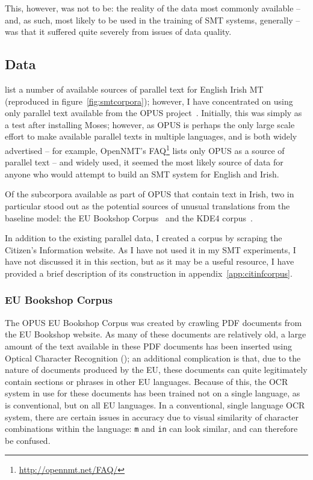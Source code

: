This, however, was not to be: the reality of the data most commonly available -- and, as such, most likely
to be used in the training of SMT systems, generally -- was that it suffered quite severely from issues
of data quality.

\subsection{Data}
\label{ssect:smtdata}

\citet{ARCAN16.9} list a number of available sources of parallel text for English Irish MT (reproduced in figure~\ref{fig:smtcorpora}); however, I have concentrated
on using only parallel text available from the OPUS project~\citep{TIEDEMANN12.463}. Initially, this was simply as a test after
installing Moses; however, as OPUS is perhaps the only large scale effort to make available parallel texts in multiple languages,
and is both widely advertised -- for example, OpenNMT's FAQ\footnote{\href{http://opennmt.net/FAQ/}{http://opennmt.net/FAQ/}}
lists only OPUS as a source of parallel text -- and widely used, it seemed the most likely source of data
for anyone who would attempt to build an SMT system for English and Irish.

Of the subcorpora available as part of OPUS that contain text in Irish, two in particular stood out as the potential
sources of unusual translations from the baseline model: the EU Bookshop Corpus~\citep{SkadinsEA:LREC14} and the
KDE4 corpus~\citep[s. 2.3]{Tiedemann:RANLP5}.

In addition to the existing parallel data, I created a corpus by scraping the Citizen's Information website.
As I have not used it in my SMT experiments, I have not discussed it in this section, but as it may be a
useful resource, I have provided a brief description of its construction in appendix~\ref{app:citinfcorpus}.

\subsubsection{EU Bookshop Corpus}

The OPUS EU Bookshop Corpus was created by crawling PDF documents from the EU Bookshop website. 
As many of these documents are relatively old, a large amount of the text available in these PDF documents has been 
inserted using Optical Character Recognition (); an additional complication is that, due to the nature of documents
produced by the EU, these documents can quite legitimately contain sections or phrases in other EU languages. Because of
this, the OCR system in use for these documents has been trained not on a single language, as is conventional, but on all
EU languages. In a conventional, single language OCR system, there are certain issues in accuracy due to visual similarity
of character combinations within the language: \texttt{m} and \texttt{in} can look similar, and can therefore be confused.

